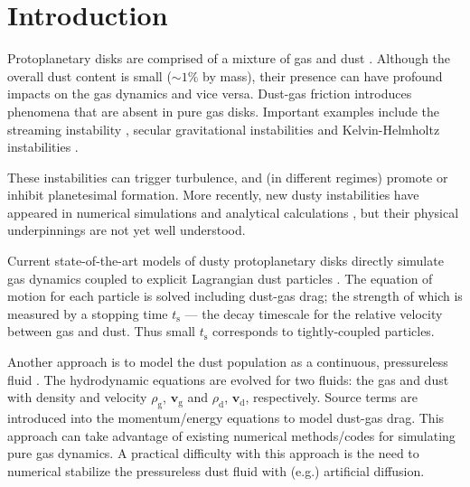 \documentclass[iop, numberedappendix]{emulateapj}
\newcommand{\rhod}{\rho_\mathrm{d}}
\newcommand{\rhog}{\rho_\mathrm{g}}
\newcommand{\tstop}{t_\mathrm{s}}
\begin{document}
\section{Introduction}
Protoplanetary disks are comprised of a mixture of gas and dust
\citep{chiang10}. Although the overall dust content is small
($\sim 1\%$ by mass), their presence can have profound impacts on the 
gas dynamics and vice versa. Dust-gas friction introduces phenomena
that are absent in pure gas disks. Important examples include the
streaming instability 
\citep[SI,][]{youdin05a,youdin07b,johansen07}, secular gravitational
instabilities \citep[SGI,][]{ward00,youdin11,michikoshi12,takahashi14,taka16,latter17} and 
Kelvin-Helmholtz instabilities
\citep{goldreich1973, chiang08,barranco09,lee10}. 

These instabilities can trigger turbulence, and (in different regimes) promote or inhibit  
planetesimal formation. 
More recently, new 
dusty instabilities have appeared in numerical  
simulations \citep{loren15,loren16,lamb16} and analytical calculations \citep{squire17,hopkins17},   
but their physical underpinnings are not yet well 
understood. 



Current state-of-the-art models of dusty protoplanetary
disks directly simulate gas dynamics coupled to explicit
Lagrangian dust particles
\citep{johansen2006, nelson10,bai10,yang14,zhu14,gibbons15,simon16,baruteau16}. 
The equation of motion for each particle is solved 
including dust-gas drag; the strength of which is measured 
by a stopping time $\tstop$ --- the decay timescale for the 
relative velocity between gas and dust. Thus small $\tstop$
corresponds to tightly-coupled particles. 


Another approach is to model the dust population as a continuous, pressureless
fluid 
\citep{barriere-fouchet05,paardekooper06b,ayliffe12,meheut12,laibe12,loren14,fu14b,surville16}. The 
hydrodynamic equations are evolved for two fluids: the gas and dust with density and
velocity $\rhog$, $\bm{v}_\mathrm{g}$ and $\rhod$, 
$\bm{v}_\mathrm{d}$, respectively. Source terms are introduced into
the momentum/energy equations to model dust-gas drag. This approach
can take advantage of existing numerical methods/codes for
simulating pure gas dynamics. A practical difficulty with this approach is the need to numerical stabilize the pressureless dust fluid with (e.g.) artificial diffusion.
\end{document}
